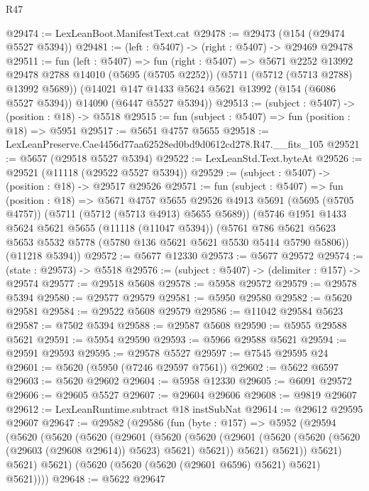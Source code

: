 \begin{lexlean}{R47}
\begin{coremodule}
@29474 := LexLeanBoot.ManifestText.cat
@29478 := @29473 (@154 (@29474 @5527 @5394))
@29481 := (left : @5407) -> (right : @5407) -> @29469 @29478
@29511 := fun (left : @5407) =>
  fun (right : @5407) =>
  @5671
    @2252
    @13992
    @29478
    @2788
    @14010
    (@5695 (@5705 @2252))
    (@5711 (@5712 (@5713 @2788) @13992 @5689))
    (@14021 @147 @1433 @5624 @5621 @13992 (@154 (@6086 @5527 @5394)) @14090 (@6447 @5527 @5394))
@29513 := (subject : @5407) -> (position : @18) -> @5518
@29515 := fun (subject : @5407) => fun (position : @18) => @5951
@29517 := @5651 @4757 @5655
@29518 := LexLeanPreserve.Cae4456d77aa62528ed0bd9d0612cd278.R47.__fits_105
@29521 := @5657 (@29518 @5527 @5394)
@29522 := LexLeanStd.Text.byteAt
@29526 := @29521 (@11118 (@29522 @5527 @5394))
@29529 := (subject : @5407) -> (position : @18) -> @29517 @29526
@29571 := fun (subject : @5407) =>
  fun (position : @18) =>
  @5671
    @4757
    @5655
    @29526
    @4913
    @5691
    (@5695 (@5705 @4757))
    (@5711 (@5712 (@5713 @4913) @5655 @5689))
    (@5746
      @1951
      @1433
      @5624
      @5621
      @5655
      (@11118 (@11047 @5394))
      (@5761 @786 @5621 @5623 @5653 @5532 @5778 (@5780 @136 @5621 @5621 @5530 @5414 @5790 @5806))
      (@11218 @5394))
@29572 := @5677 @12330
@29573 := @5677 @29572
@29574 := (state : @29573) -> @5518
@29576 := (subject : @5407) -> (delimiter : @157) -> @29574
@29577 := @29518 @5608
@29578 := @5958 @29572
@29579 := @29578 @5394
@29580 := @29577 @29579
@29581 := @5950 @29580
@29582 := @5620 @29581
@29584 := @29522 @5608 @29579
@29586 := @11042 @29584 @5623
@29587 := @7502 @5394
@29588 := @29587 @5608
@29590 := @5955 @29588 @5621
@29591 := @5954 @29590
@29593 := @5966 @29588 @5621
@29594 := @29591 @29593
@29595 := @29578 @5527
@29597 := @7545 @29595 @24
@29601 := @5620 (@5950 (@7246 @29597 @7561))
@29602 := @5622 @6597
@29603 := @5620 @29602
@29604 := @5958 @12330
@29605 := @6091 @29572
@29606 := @29605 @5527
@29607 := @29604 @29606
@29608 := @9819 @29607
@29612 := LexLeanRuntime.subtract @18 instSubNat
@29614 := @29612 @29595 @29607
@29647 := @29582
    (@29586
      (fun (byte : @157) =>
      @5952
        (@29594
          (@5620
            (@5620
              (@5620
                (@29601
                  (@5620
                    (@5620
                      (@29601 (@5620 (@5620 (@5620 (@29603 (@29608 @29614)) @5623) @5621) @5621))
                      @5621)
                    @5621))
                @5621)
              @5621)
            @5621)
          (@5620 (@5620 (@5620 (@29601 @6596) @5621) @5621) @5621))))
@29648 := @5622 @29647

\end{coremodule}
\end{lexlean}
